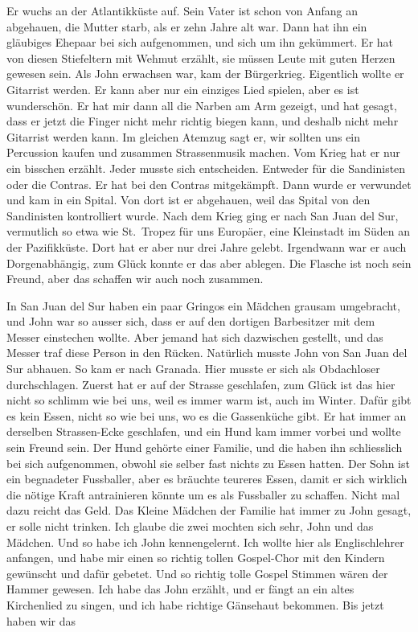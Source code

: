 \documentclass[
]{article}
\begin{document}
Er wuchs an der Atlantikküste auf. Sein Vater ist schon von Anfang an
abgehauen, die Mutter starb, als er zehn Jahre alt war. Dann hat ihn ein
gläubiges Ehepaar bei sich aufgenommen, und sich um ihn gekümmert. Er
hat von diesen Stiefeltern mit Wehmut erzählt, sie müssen Leute mit
guten Herzen gewesen sein. Als John erwachsen war, kam der Bürgerkrieg.
Eigentlich wollte er Gitarrist werden. Er kann aber nur ein einziges
Lied spielen, aber es ist wunderschön. Er hat mir dann all die Narben am
Arm gezeigt, und hat gesagt, dass er jetzt die Finger nicht mehr richtig
biegen kann, und deshalb nicht mehr Gitarrist werden kann. Im gleichen
Atemzug sagt er, wir sollten uns ein Percussion kaufen und zusammen
Strassenmusik machen. Vom Krieg hat er nur ein bisschen erzählt. Jeder
musste sich entscheiden. Entweder für die Sandinisten oder die Contras.
Er hat bei den Contras mitgekämpft. Dann wurde er verwundet und kam in
ein Spital. Von dort ist er abgehauen, weil das Spital von den
Sandinisten kontrolliert wurde. Nach dem Krieg ging er nach San Juan del
Sur, vermutlich so etwa wie St.~Tropez für uns Europäer, eine Kleinstadt
im Süden an der Pazifikküste. Dort hat er aber nur drei Jahre gelebt.
Irgendwann war er auch Dorgenabhängig, zum Glück konnte er das aber
ablegen. Die Flasche ist noch sein Freund, aber das schaffen wir auch
noch zusammen.

In San Juan del Sur haben ein paar Gringos ein Mädchen grausam
umgebracht, und John war so ausser sich, dass er auf den dortigen
Barbesitzer mit dem Messer einstechen wollte. Aber jemand hat sich
dazwischen gestellt, und das Messer traf diese Person in den Rücken.
Natürlich musste John von San Juan del Sur abhauen. So kam er nach
Granada. Hier musste er sich als Obdachloser durchschlagen. Zuerst hat
er auf der Strasse geschlafen, zum Glück ist das hier nicht so schlimm
wie bei uns, weil es immer warm ist, auch im Winter. Dafür gibt es kein
Essen, nicht so wie bei uns, wo es die Gassenküche gibt. Er hat immer an
derselben Strassen-Ecke geschlafen, und ein Hund kam immer vorbei und
wollte sein Freund sein. Der Hund gehörte einer Familie, und die haben
ihn schliesslich bei sich aufgenommen, obwohl sie selber fast nichts zu
Essen hatten. Der Sohn ist ein begnadeter Fussballer, aber es bräuchte
teureres Essen, damit er sich wirklich die nötige Kraft antrainieren
könnte um es als Fussballer zu schaffen. Nicht mal dazu reicht das Geld.
Das Kleine Mädchen der Familie hat immer zu John gesagt, er solle nicht
trinken. Ich glaube die zwei mochten sich sehr, John und das Mädchen.
Und so habe ich John kennengelernt. Ich wollte hier als Englischlehrer
anfangen, und habe mir einen so richtig tollen Gospel-Chor mit den
Kindern gewünscht und dafür gebetet. Und so richtig tolle Gospel Stimmen
wären der Hammer gewesen. Ich habe das John erzählt, und er fängt an ein
altes Kirchenlied zu singen, und ich habe richtige Gänsehaut bekommen.
Bis jetzt haben wir das
\end{document}
